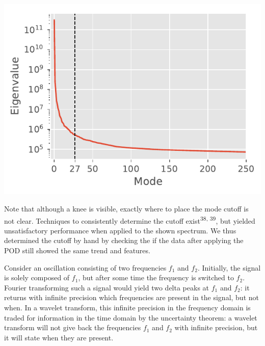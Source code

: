 \documentclass{Dissertate}
\let\origfigure\figure
\let\endorigfigure\endfigure
\renewenvironment{figure}[1][2] {
    \expandafter\origfigure\expandafter[H]
} {
    \endorigfigure
}
\begin{document}
\begin{figure}
\hypertarget{fig:eigen}{%
\centering
\includegraphics{source/figures/pdf/eigenspectrum.pdf}
\caption{Eigenvalue spectrum of the POD of the ManII data. We have placed the cutoff at mode 27.}\label{fig:eigen}
}
\end{figure}

Note that although a knee is visible, exactly where to place the mode cutoff is not clear. Techniques to consistently determine the cutoff exist\textsuperscript{38, 39}, but yielded unsatisfactory performance when applied to the shown spectrum. We thus determined the cutoff by hand by checking the if the data after applying the POD still showed the same trend and features.

 Consider an oscillation consisting of two frequencies $f_1$ and $f_2$. Initially, the signal is solely composed of $f_1$, but after some time the frequency is switched to $f_2$. Fourier transforming such a signal would yield two delta peaks at $f_1$ and $f_2$: it returns with infinite precision which frequencies are present in the signal, but not when. In a wavelet transform, this infinite precision in the frequency domain is traded for information in the time domain by the uncertainty theorem: a wavelet transform will not give back the frequencies $f_1$ and $f_2$ with infinite precision, but it will state when they are present. 
 
\end{document}
